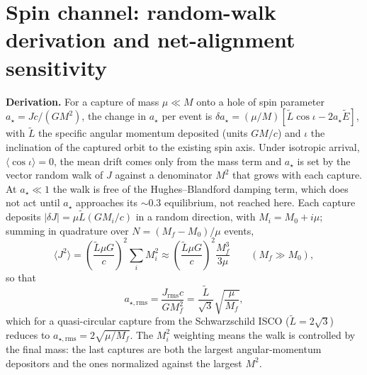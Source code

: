 \documentclass[11pt]{article}
\newcommand{\astar}{\ensuremath{a_\star}}
\begin{document}
\section{Spin channel: random-walk derivation and net-alignment sensitivity}
\label{app:spin}

\textbf{Derivation.} For a capture of mass $\mu \ll M$ onto a hole of spin parameter $\astar = Jc/(GM^{2})$, the change in $\astar$ per event is $\delta\astar = (\mu/M)[\tilde L\cos\iota - 2\astar\tilde E]$, with $\tilde L$ the specific angular momentum deposited (units $GM/c$) and $\iota$ the inclination of the captured orbit to the existing spin axis. Under isotropic arrival, $\langle\cos\iota\rangle = 0$, the mean drift comes only from the mass term and $\astar$ is set by the vector random walk of $J$ against a denominator $M^{2}$ that grows with each capture. At $\astar \ll 1$ the walk is free of the Hughes--Blandford damping term, which does not act until $\astar$ approaches its $\sim 0.3$ equilibrium, not reached here. Each capture deposits $|\delta J| = \mu\tilde L(GM_{i}/c)$ in a random direction, with $M_{i} = M_{0} + i\mu$; summing in quadrature over $N = (M_{f} - M_{0})/\mu$ events,
\begin{equation}
\langle J^{2}\rangle = \left(\frac{\tilde L\mu G}{c}\right)^{2}\sum_{i} M_{i}^{2} \approx \left(\frac{\tilde L\mu G}{c}\right)^{2}\frac{M_{f}^{3}}{3\mu} \qquad (M_{f} \gg M_{0}),
\end{equation}
so that
\begin{equation}
a_{\star,\mathrm{rms}} = \frac{J_{\mathrm{rms}}c}{GM_{f}^{2}} = \frac{\tilde L}{\sqrt3}\sqrt{\frac{\mu}{M_{f}}},
\end{equation}
which for a quasi-circular capture from the Schwarzschild ISCO ($\tilde L = 2\sqrt3$) reduces to $a_{\star,\mathrm{rms}} = 2\sqrt{\mu/M_{f}}$. The $M_{i}^{2}$ weighting means the walk is controlled by the final mass: the last captures are both the largest angular-momentum depositors and the ones normalized against the largest $M^{2}$.
\end{document}
